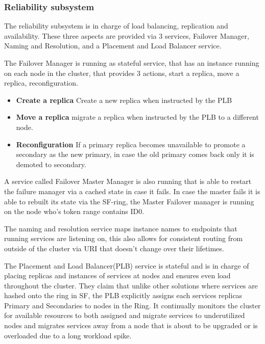 \documentclass[a4paper,10pt,titlepage]{report}
\begin{document}
    \subsubsection{Reliability subsystem}
    The reliability subsystem is in charge of load balancing, replication and availability. These three aspects are provided via 3 services, Failover Manager, Naming and Resolution, and a Placement and Load Balancer service.\\
    \vspace{5mm}

    The Failover Manager is running as stateful service, that has an instance running on each node in the cluster, that provides 3 actions, start a replica, move a replica, reconfiguration.\\
    \vspace{5mm}

    \begin{itemize}
        \item \textbf{Create a replica} Create a new replica when instructed by the PLB
        \item \textbf{Move a replica} migrate a replica when instructed by the PLB to a different node.
        \item \textbf{Reconfiguration} If a primary replica becomes unavailable to promote a secondary as the new primary, in case the old primary comes back only it is demoted to secondary.
    \end{itemize}

    A service called Failover Master Manager is also running that is able to restart the failure manager via a cached state in case it fails. In case the master fails it is able to rebuilt its state via the SF-ring, the Master Failover manager is running on the node who's token range contains ID0.\\
    \vspace{5mm}

    The naming and resolution service maps instance names to endpoints that running services are listening on, this also allows for consistent routing from outside of the cluster via URI that doesn't change over their lifetimes.\\
    \vspace{5mm}

    The Placement and Load Balancer(PLB) service is stateful and is in charge of placing replicas and instances of services at nodes and ensures even load throughout the cluster. They claim that unlike other solutions where services are hashed onto the ring in SF, the PLB explicitly assigns each services replicas Primary and Secondaries to nodes in the Ring. It continually monitors the cluster for available resources to both assigned and migrate services to underutilized nodes and migrates services away from a node that is about to be upgraded or is overloaded due to a long workload spike.\\
    \vspace{5mm}
\end{document}
